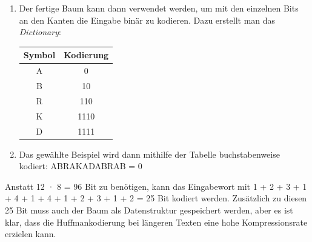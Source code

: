 \documentclass[course=erap]{aspdoc}
\begin{document}
\begin{enumerate}
\item Der fertige Baum kann dann verwendet werden, um mit den einzelnen Bits an den Kanten die Eingabe binär zu kodieren. Dazu erstellt man das \emph{Dictionary}: \newline

\centering 
\begin{tabular}{||c | c||} 
 \hline
Symbol & Kodierung \\ [0.5ex]
 \hline
A & 0\\ [0.5ex]
\hline
B & 10\\ [0.5ex]
\hline
R & 110\\ [0.5ex]
\hline
K & 1110\\ [0.5ex]
\hline
D & 1111\\ [0.5ex]
\hline
\end{tabular}
\item Das gewählte Beispiel wird dann mithilfe der Tabelle buchstabenweise kodiert:\newline\newline
ABRAKADABRAB = 0            \newline
\end{enumerate}
Anstatt 12 · 8 = 96 Bit zu benötigen, kann das Eingabewort mit 1 + 2 + 3 + 1 + 4 + 1 + 4 + 1 + 2 + 3 + 1 + 2 = 25 Bit kodiert werden. Zusätzlich zu diesen 25 Bit muss auch der Baum als Datenstruktur gespeichert werden, aber es ist klar, dass die Huffmankodierung bei längeren Texten eine hohe Kompressionsrate erzielen kann.
\end{document}
